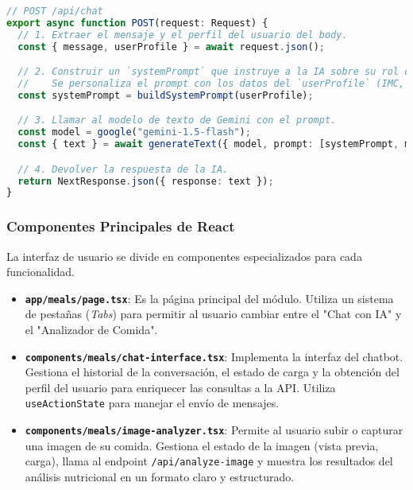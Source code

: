\documentclass[12pt,a4paper]{article}
\begin{document}
\begin{lstlisting}[language=typescript, caption={Lógica simplificada del endpoint `/api/chat`}]
// POST /api/chat
export async function POST(request: Request) {
  // 1. Extraer el mensaje y el perfil del usuario del body.
  const { message, userProfile } = await request.json();

  // 2. Construir un `systemPrompt` que instruye a la IA sobre su rol como nutricionista.
  //    Se personaliza el prompt con los datos del `userProfile` (IMC, BMR, etc.).
  const systemPrompt = buildSystemPrompt(userProfile);

  // 3. Llamar al modelo de texto de Gemini con el prompt.
  const model = google("gemini-1.5-flash");
  const { text } = await generateText({ model, prompt: [systemPrompt, message] });

  // 4. Devolver la respuesta de la IA.
  return NextResponse.json({ response: text });
}
\end{lstlisting}

\subsubsection{Componentes Principales de React}

La interfaz de usuario se divide en componentes especializados para cada funcionalidad.

\begin{itemize}
    \item \textbf{\texttt{app/meals/page.tsx}}: Es la página principal del módulo. Utiliza un sistema de pestañas (\textit{Tabs}) para permitir al usuario cambiar entre el "Chat con IA" y el "Analizador de Comida".
    
    \item \textbf{\texttt{components/meals/chat-interface.tsx}}: Implementa la interfaz del chatbot. Gestiona el historial de la conversación, el estado de carga y la obtención del perfil del usuario para enriquecer las consultas a la API. Utiliza \texttt{useActionState} para manejar el envío de mensajes.
    
    \item \textbf{\texttt{components/meals/image-analyzer.tsx}}: Permite al usuario subir o capturar una imagen de su comida. Gestiona el estado de la imagen (vista previa, carga), llama al endpoint \texttt{/api/analyze-image} y muestra los resultados del análisis nutricional en un formato claro y estructurado.
\end{itemize}
\end{document}
